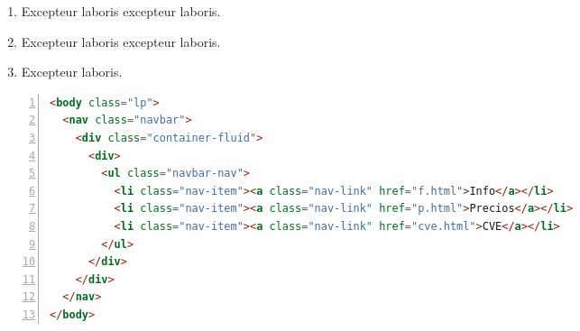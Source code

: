 \documentclass[a4paper,12pt]{article}
\begin{document}
\begin{enumerate}[label=\textbf{\arabic*.}]
\begin{multicols}{2}
\begin{enumerate}
		\item  Excepteur laboris excepteur laboris.
  
		\item  Excepteur laboris excepteur laboris.
    
		\item  Excepteur laboris.
    
	\end{enumerate}

\end{multicols}
\end{enumerate}

\newpage
\begin{lstlisting}[language=HTML, caption={Documento en HTML}, label={lst:1}, numbers=left]
<body class="lp">
  <nav class="navbar">
    <div class="container-fluid">
      <div>
        <ul class="navbar-nav">
          <li class="nav-item"><a class="nav-link" href="f.html">Info</a></li>
          <li class="nav-item"><a class="nav-link" href="p.html">Precios</a></li>
          <li class="nav-item"><a class="nav-link" href="cve.html">CVE</a></li>
        </ul>
      </div>
    </div>
  </nav>
</body>
\end{lstlisting}
\end{document}
